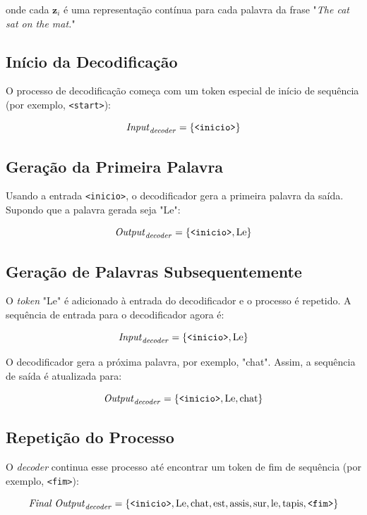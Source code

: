 onde cada \(\textbf{z}_i\) é uma representação contínua para cada palavra da frase "\textit{The cat sat on the mat.}"

\subsection*{Início da Decodificação}

O processo de decodificação começa com um token especial de início de sequência (por exemplo, \texttt{<start>}):

\[
\text{\textit{Input}}_\text{\textit{decoder}} = \{ \texttt{<inicio>} \}
\]

\subsection*{Geração da Primeira Palavra}

Usando a entrada \texttt{<inicio>}, o decodificador gera a primeira palavra da saída. Supondo que a palavra gerada seja "Le":

\[
\text{\textit{Output}}_\text{\textit{decoder}} = \{ \texttt{<inicio>}, \text{Le} \}
\]

\subsection*{Geração de Palavras Subsequentemente}

O \textit{token} "Le" é adicionado à entrada do decodificador e o processo é repetido. A sequência de entrada para o decodificador agora é:

\[
\text{\textit{Input}}_\text{\textit{decoder}} = \{ \texttt{<inicio>}, \text{Le} \}
\]

O decodificador gera a próxima palavra, por exemplo, "chat". Assim, a sequência de saída é atualizada para:

\[
\text{\textit{Output}}_\text{\textit{decoder}} = \{ \texttt{<inicio>}, \text{Le}, \text{chat} \}
\]

\subsection*{Repetição do Processo}

O \textit{decoder} continua esse processo até encontrar um token de fim de sequência (por exemplo, \texttt{<fim>}):

\[
\text{\textit{Final Output}}_\text{\textit{decoder}} = \{ \texttt{<inicio>}, \text{Le}, \text{chat}, \text{est}, \text{assis}, \text{sur}, \text{le}, \text{tapis}, \texttt{<fim>} \}
\]

